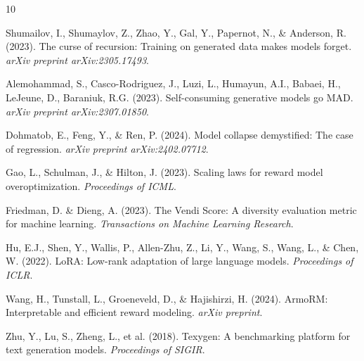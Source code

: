 \documentclass[11pt,a4paper]{article}
\begin{document}

\begin{thebibliography}{10}

Shumailov, I., Shumaylov, Z., Zhao, Y., Gal, Y., Papernot, N., \& Anderson, R. (2023).
The curse of recursion: Training on generated data makes models forget.
\textit{arXiv preprint arXiv:2305.17493}.

Alemohammad, S., Casco-Rodriguez, J., Luzi, L., Humayun, A.I., Babaei, H., LeJeune, D., Baraniuk, R.G. (2023).
Self-consuming generative models go MAD.
\textit{arXiv preprint arXiv:2307.01850}.

Dohmatob, E., Feng, Y., \& Ren, P. (2024).
Model collapse demystified: The case of regression.
\textit{arXiv preprint arXiv:2402.07712}.

Gao, L., Schulman, J., \& Hilton, J. (2023).
Scaling laws for reward model overoptimization.
\textit{Proceedings of ICML}.

Friedman, D. \& Dieng, A. (2023).
The Vendi Score: A diversity evaluation metric for machine learning.
\textit{Transactions on Machine Learning Research}.

Hu, E.J., Shen, Y., Wallis, P., Allen-Zhu, Z., Li, Y., Wang, S., Wang, L., \& Chen, W. (2022).
LoRA: Low-rank adaptation of large language models.
\textit{Proceedings of ICLR}.

Wang, H., Tunstall, L., Groeneveld, D., \& Hajishirzi, H. (2024).
ArmoRM: Interpretable and efficient reward modeling.
\textit{arXiv preprint}.

Zhu, Y., Lu, S., Zheng, L., et al. (2018).
Texygen: A benchmarking platform for text generation models.
\textit{Proceedings of SIGIR}.

\end{thebibliography}
\end{document}

